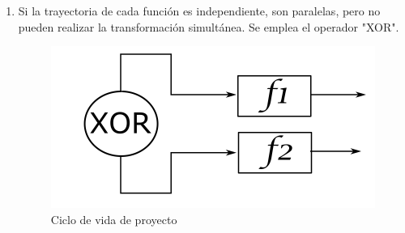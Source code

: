 \begin{enumerate}
    \item Si la trayectoria de cada función es independiente, son paralelas, pero no pueden realizar la transformación simultánea. Se emplea el operador "XOR".
    
    \begin{figure}[h!]
        \centering
            \includegraphics[scale=0.25]{Proyecto Integrador Figuras/14 Funcion XOR.png}
            \caption{Ciclo de vida de proyecto}
     \end{figure}
\end{enumerate}